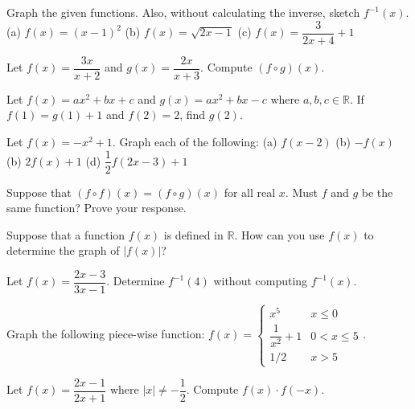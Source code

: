 \documentclass[../book.tex]{subfiles}
\begin{document}
\begin{reviewset}
\item Graph the given functions.  Also, without calculating the inverse, sketch $f^{-1}(x)$.  \newline 
(a) $f(x)=(x-1)^2$ \hspace{18mm} (b) $f(x)=\sqrt{2x-1}$ \hspace{22mm} (c) $f(x)=\dfrac{3}{2x+4}+1$\vspace{2mm}

\item Let $f(x)=\dfrac{3x}{x+2}$ and $g(x)=\dfrac{2x}{x+3}$.  Compute $(f\circ g)(x)$.  \vspace{2mm}

\item Let $f(x)=ax^2+bx+c$ and $g(x)=ax^2+bx-c$ where $a,b,c\in\mathbb{R}$.  If $f(1)=g(1)+1$ and $f(2)=2$, find $g(2)$.\vspace{2mm}

\item Let $f(x)=-x^2+1$.  Graph each of the following: \newline 
(a) $f(x-2)$ \hspace{50mm} (b) $-f(x)$ \newline 
(b) $2f(x)+1$ \hspace{48mm} (d) $\dfrac{1}{2}f(2x-3)+1$\vspace{2mm}

\item Suppose that $(f\circ f)(x)=(f\circ g)(x)$ for all real $x$.  Must $f$ and $g$ be the same function?  Prove your response.  \vspace{2mm}

\item Suppose that a function $f(x)$ is defined in $\mathbb{R}$.  How can you use $f(x)$ to determine the graph of $|f(x)|$? \vspace{2mm}

\item Let $f(x)=\dfrac{2x-3}{3x-1}$.  Determine $f^{-1}(4)$ without computing $f^{-1}(x)$.\vspace{2mm}

\item Graph the following piece-wise function: $f(x)=\begin{cases} x^5 & x\leq 0 \\ \dfrac{1}{x^2}+1 & 0<x\leq 5 \\ 1/2 & x>5 \end{cases}$.\vspace{2mm}

\item Let $f(x)=\dfrac{2x-1}{2x+1}$ where $|x|\neq-\dfrac{1}{2}$.  Compute $f(x)\cdot f(-x)$.
\end{reviewset}
\end{document}
